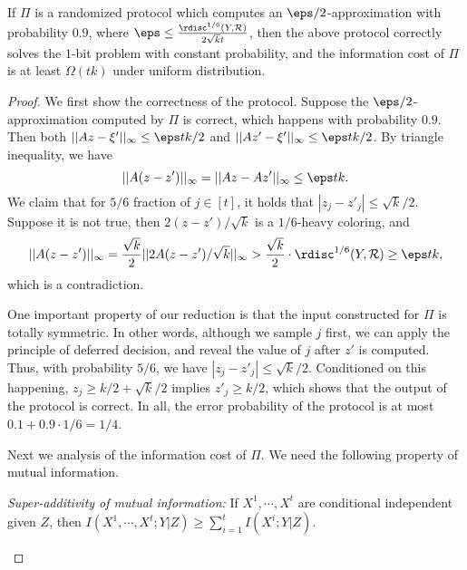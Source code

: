 \begin{lemma}\label{lemma:correctness}
If $\Pi$ is a randomized protocol which computes an $\eps/2$-approximation with probability $0.9$, where $\eps\le\frac{\rdisc^{1/6}(Y, \mathcal{R})}{2\sqrt{k}t}$, then the above protocol correctly solves the $1$-bit problem with constant probability, and the information cost of $\Pi$ is at least $\Omega(tk)$ under uniform distribution.
\end{lemma}

\begin{proof}
We first show the correctness of the protocol.  Suppose the $\eps/2$-approximation computed by $\Pi$ is correct, which happens with probability $0.9$. Then both $||Az-\xi'||_{\infty}\le \eps tk/2$ and $||Az'-\xi'||_{\infty}\le \eps tk/2$. By triangle inequality, we have 
$$||A(z-z')||_{\infty} = ||Az-Az'||_{\infty}\le \eps tk.$$
We claim that for $5/6$ fraction of $j\in [t]$, it holds that $|z_j-z'_j|\le \sqrt{k}/2$. Suppose it is not true, then $2(z-z')/\sqrt{k}$ is a $1/6$-heavy coloring, and 
$$||A(z-z')||_{\infty}=\frac{\sqrt{k}}{2}||2A(z-z')/\sqrt{k}||_{\infty}>\frac{\sqrt{k}}{2}\cdot \rdisc^{1/6}(Y,\mathcal{R})\ge\eps tk,$$
which is a contradiction.

One important property of our reduction is that the input constructed for $\Pi$ is totally symmetric. In other words, although we sample $j$ first, we can apply the principle of deferred decision, and reveal the value of $j$ after $z'$ is computed. Thus, with probability $5/6$, we have $|z_j-z'_j|\le \sqrt{k}/2$. Conditioned on this happening, $z_j\ge k/2+\sqrt{k}/2$ implies $z'_j\ge k/2$, which shows that the output of the protocol is correct. In all, the error probability of the protocol is at most $0.1+0.9\cdot 1/6=1/4$.

Next we analysis of the information cost of $\Pi$.  We need the following property of
mutual information.  \vskip 2pt
\begin{proposition}
{\em Super-additivity of mutual information:} If $X^1, \cdots, X^t$ are conditional independent given $Z$, then 
$I(X^1, \cdots,  X^t; Y|Z)\ge \sum_{i=1}^t I(X^i; Y|Z)$.
\end{proposition}



\end{proof}
